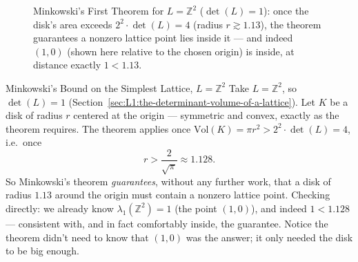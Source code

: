 \begin{figure}[h]
\centering
{}
\caption{Minkowski's First Theorem for $L = \mathbb{Z}^2$ ($\det(L)=1$): once the disk's area exceeds $2^2 \cdot \det(L) = 4$ (radius $r \gtrsim 1.13$), the theorem guarantees a nonzero lattice point lies inside it --- and indeed $(1,0)$ (shown here relative to the chosen origin) is inside, at distance exactly $1 < 1.13$.}
\label{fig:minkowski-disk}
\end{figure}

\begin{exbox}{Minkowski's Bound on the Simplest Lattice, $L = \mathbb{Z}^2$}
Take $L = \mathbb{Z}^2$, so $\det(L) = 1$ (Section~\ref{sec:L1:the-determinant-volume-of-a-lattice}). Let $K$ be a disk of radius $r$ centered at the origin --- symmetric and convex, exactly as the theorem requires. The theorem applies once $\mathrm{Vol}(K) = \pi r^2 > 2^2 \cdot \det(L) = 4$, i.e.\ once
$$
r > \frac{2}{\sqrt{\pi}} \approx 1.128.
$$
So Minkowski's theorem \emph{guarantees}, without any further work, that a disk of radius $1.13$ around the origin must contain a nonzero lattice point. Checking directly: we already know $\lambda_1(\mathbb{Z}^2) = 1$ (the point $(1,0)$), and indeed $1 < 1.128$ --- consistent with, and in fact comfortably inside, the guarantee. Notice the theorem didn't need to know that $(1,0)$ was the answer; it only needed the disk to be big enough.
\end{exbox}

